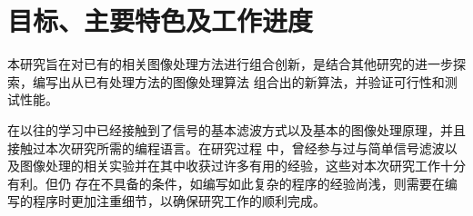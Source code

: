 %
%
%
%

\section{目标、主要特色及工作进度}

本研究旨在对已有的相关图像处理方法进行组合创新，是结合其他研究的进一步探索，编写出从已有处理方法的图像处理算法
组合出的新算法，并验证可行性和测试性能。

在以往的学习中已经接触到了信号的基本滤波方式以及基本的图像处理原理，并且接触过本次研究所需的编程语言。在研究过程
中，曾经参与过与简单信号滤波以及图像处理的相关实验并在其中收获过许多有用的经验，这些对本次研究工作十分有利。但仍
存在不具备的条件，如编写如此复杂的程序的经验尚浅，则需要在编写的程序时更加注重细节，以确保研究工作的顺利完成。
